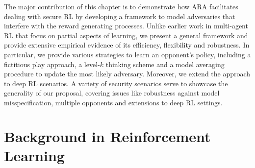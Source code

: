 The major contribution of this chapter is
to demonstrate how ARA facilitates dealing with 
secure RL by developing
a framework to model adversaries that interfere with the reward
generating processes. %
Unlike earlier work in multi-agent RL that focus on partial aspects
of learning, we present a general framework and provide extensive empirical evidence of its efficiency, flexibility and robustness.
In particular, we provide
various strategies to learn an opponent's policy, including a fictitious play approach, a level-$k$ thinking scheme and a model averaging procedure to update the most likely adversary. Moreover, we extend 
the approach to deep RL scenarios.
A variety of security scenarios serve to showcase the 
generality of our proposal, covering issues like robustness
against model misspecification, multiple opponents and extensions
to deep RL settings.
 






\section{Background in Reinforcement Learning}\label{sec:background}

